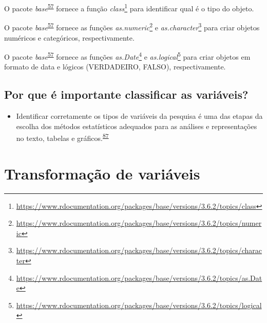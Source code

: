 \documentclass[
  a4paper,
]{book}
\providecommand{\tightlist}{%
  \setlength{\itemsep}{0pt}\setlength{\parskip}{0pt}}
\renewcommand{\href}[2]{#2\footnote{\url{#1}}}
\newenvironment{infobox}[1]
  {
  \begin{itemize}
  \renewcommand{\labelitemi}{
    \raisebox{-.7\height}[0pt][0pt]{
      {\setkeys{Gin}{width=3em,keepaspectratio}
        \texttt{[image: \#1]}}
    }
  }
  \setlength{\fboxsep}{1em}
  \begin{blackbox}
  \item
  }
  {
  \end{blackbox}
  \end{itemize}
  }
\begin{document}
\begin{infobox}{images/Rlogo}
O pacote \emph{base}\textsuperscript{\protect\hyperlink{ref-base-2}{57}} fornece a função \href{https://www.rdocumentation.org/packages/base/versions/3.6.2/topics/class}{\emph{class}} para identificar qual é o tipo do objeto.

\end{infobox}

\begin{infobox}{images/Rlogo}
O pacote \emph{base}\textsuperscript{\protect\hyperlink{ref-base-2}{57}} fornece as funções \href{https://www.rdocumentation.org/packages/base/versions/3.6.2/topics/numeric}{\emph{as.numeric}} e \href{https://www.rdocumentation.org/packages/base/versions/3.6.2/topics/character}{\emph{as.character}} para criar objetos numéricos e categóricos, respectivamente.

\end{infobox}

\begin{infobox}{images/Rlogo}
O pacote \emph{base}\textsuperscript{\protect\hyperlink{ref-base-2}{57}} fornece as funções \href{https://www.rdocumentation.org/packages/base/versions/3.6.2/topics/as.Date}{\emph{as.Date}} e \href{https://www.rdocumentation.org/packages/base/versions/3.6.2/topics/logical}{\emph{as.logical}} para criar objetos em formato de data e lógicos (VERDADEIRO, FALSO), respectivamente.

\end{infobox}

\hypertarget{por-que-uxe9-importante-classificar-as-variuxe1veis}{%
\subsection{Por que é importante classificar as variáveis?}\label{por-que-uxe9-importante-classificar-as-variuxe1veis}}

\begin{itemize}
\tightlist
\item
  Identificar corretamente os tipos de variáveis da pesquisa é uma das etapas da escolha dos métodos estatísticos adequados para as análises e representações no texto, tabelas e gráficos.\textsuperscript{\protect\hyperlink{ref-Dettori2018}{87}}
\end{itemize}

\hypertarget{transformacao}{%
\section{Transformação de variáveis}\label{transformacao}}
\end{document}
